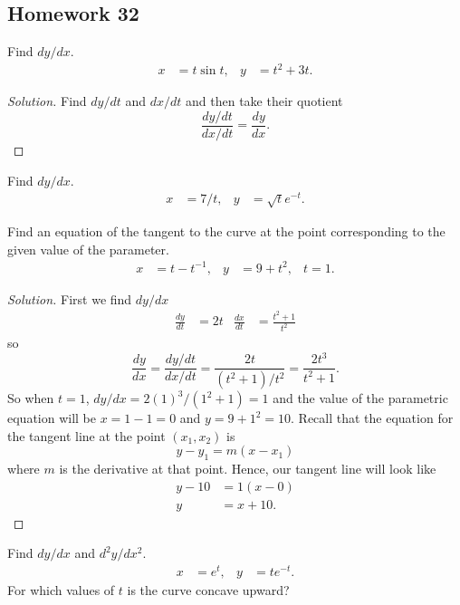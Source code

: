 \subsection{Homework 32}
\begin{problem}[WebAssign HW 32, \# 1]
Find $dy/dx$.
\[
  \begin{aligned}
    x&=t\sin t,&y&=t^2+3t.
  \end{aligned}
\]
\end{problem}
\begin{proof}[Solution]
Find $dy/dt$ and $dx/dt$ and then take their quotient
\[
\frac{dy/dt}{dx/dt}=\frac{dy}{dx}.
\]
\end{proof}
\begin{problem}[WebAssign HW 32, \# 2]
Find $dy/dx$.
\[
  \begin{aligned}
    x&=7/t,&y&=\sqrt{t}e^{-t}.
  \end{aligned}
\]
\end{problem}
\begin{problem}[WebAssign HW 32, \# 3]
Find an equation of the tangent to the curve at the point corresponding to
the given value of the parameter.
\[
\begin{aligned}
x&=t-t^{-1},&y&=9+t^2,&t=1.
\end{aligned}
\]
\end{problem}
\begin{proof}[Solution]
First we find $dy/dx$
\[
\begin{aligned}
\frac{dy}{dt}&=2t&\frac{dx}{dt}&=\frac{t^2+1}{t^2}
\end{aligned}
\]
so
\[
\frac{dy}{dx}=\frac{dy/dt}{dx/dt}=\frac{2t}{(t^2+1)/t^2}=\frac{2t^3}{t^2+1}.
\]
So when $t=1$, $dy/dx=2(1)^3/(1^2+1)=1$ and the value of the parametric
equation will be $x=1-1=0$ and $y=9+1^2=10$. Recall that the equation for
the tangent line at the point $(x_1,x_2)$ is
\[
y-y_1=m(x-x_1)
\]
where $m$ is the derivative at that point. Hence, our tangent line will
look like
\[
  \begin{aligned}
    y-10&=1(x-0)\\
    y&=x+10.
  \end{aligned}
\]
\end{proof}
\begin{problem}[WebAssign HW 32, \# 4]
Find $dy/dx$ and $d^2y/dx^2$.
\[
  \begin{aligned}
    x&=e^t,&y&=te^{-t}.
  \end{aligned}
\]
For which values of $t$ is the curve concave upward?
\end{problem}
